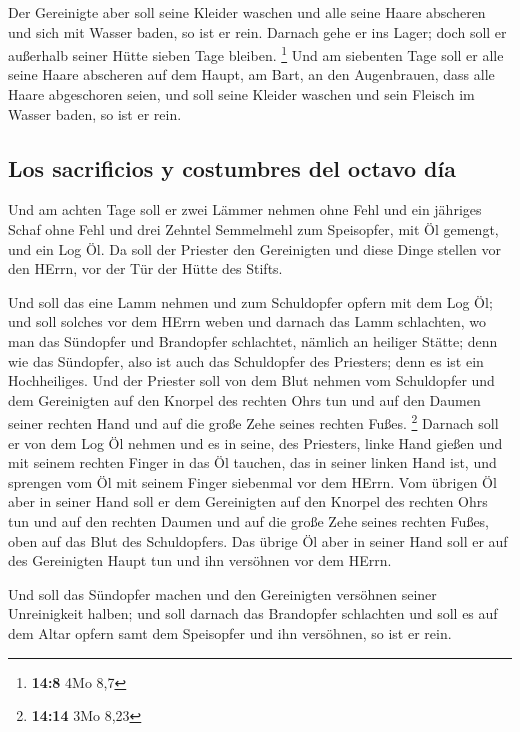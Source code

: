  Der Gereinigte aber soll seine Kleider waschen und alle
seine Haare abscheren und sich mit Wasser baden, so ist er rein. Darnach
gehe er ins Lager; doch soll er außerhalb seiner Hütte sieben Tage
bleiben. \footnote{\textbf{14:8} 4Mo 8,7}  Und am
siebenten Tage soll er alle seine Haare abscheren auf dem Haupt, am
Bart, an den Augenbrauen, dass alle Haare abgeschoren seien, und soll
seine Kleider waschen und sein Fleisch im Wasser baden, so ist er rein.

\hypertarget{los-sacrificios-y-costumbres-del-octavo-duxeda}{%
\subsection{Los sacrificios y costumbres del octavo
día}\label{los-sacrificios-y-costumbres-del-octavo-duxeda}}

 Und am achten Tage soll er zwei Lämmer nehmen ohne Fehl
und ein jähriges Schaf ohne Fehl und drei Zehntel Semmelmehl zum
Speisopfer, mit Öl gemengt, und ein Log Öl.  Da soll der
Priester den Gereinigten und diese Dinge stellen vor den HErrn, vor der
Tür der Hütte des Stifts.

 Und soll das eine Lamm nehmen und zum Schuldopfer opfern
mit dem Log Öl; und soll solches vor dem HErrn weben  und
darnach das Lamm schlachten, wo man das Sündopfer und Brandopfer
schlachtet, nämlich an heiliger Stätte; denn wie das Sündopfer, also ist
auch das Schuldopfer des Priesters; denn es ist ein Hochheiliges.
 Und der Priester soll von dem Blut nehmen vom
Schuldopfer und dem Gereinigten auf den Knorpel des rechten Ohrs tun und
auf den Daumen seiner rechten Hand und auf die große Zehe seines rechten
Fußes. \footnote{\textbf{14:14} 3Mo 8,23}  Darnach soll
er von dem Log Öl nehmen und es in seine, des Priesters, linke Hand
gießen  und mit seinem rechten Finger in das Öl tauchen,
das in seiner linken Hand ist, und sprengen vom Öl mit seinem Finger
siebenmal vor dem HErrn.  Vom übrigen Öl aber in seiner
Hand soll er dem Gereinigten auf den Knorpel des rechten Ohrs tun und
auf den rechten Daumen und auf die große Zehe seines rechten Fußes, oben
auf das Blut des Schuldopfers.  Das übrige Öl aber in
seiner Hand soll er auf des Gereinigten Haupt tun und ihn versöhnen vor
dem HErrn.

 Und soll das Sündopfer machen und den Gereinigten
versöhnen seiner Unreinigkeit halben; und soll darnach das Brandopfer
schlachten  und soll es auf dem Altar opfern samt dem
Speisopfer und ihn versöhnen, so ist er rein.

